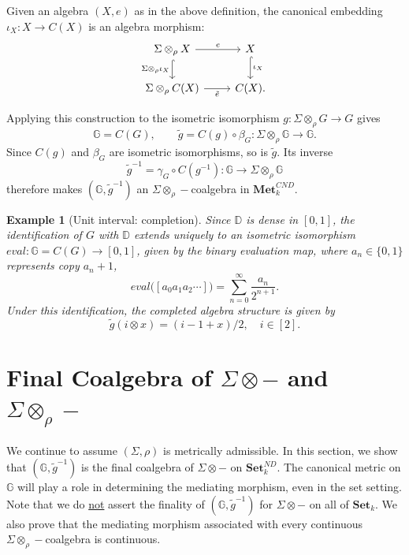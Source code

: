 \documentclass{sn-jnl}%
\theoremstyle{thmstyleone}%
\theoremstyle{thmstyletwo}%
\newtheorem{example}{Example}%
\theoremstyle{thmstylethree}%
\newcommand{\set}{\mathbf{Set}_{k}}
\newcommand{\setnd}{\mathbf{Set}_{k}^{ND}}
\newcommand{\mcnd}{\mathbf{Met}_{k}^{CND}}
\newcommand{\M}{\Sigma}
\newcommand{\F}{\M\otimes}
\newcommand{\Fw}{\M\otimes_{\w}}
\newcommand{\G}{\mathbb{G}}
\newcommand{\g}{\tilde{g}^{-1}}
\newcommand{\w}{\rho}
\begin{document}
Given an algebra $(X,e)$ as in the above definition, the canonical embedding $\iota_X: X \to C(X)$ is an algebra morphism:
\begin{equation}
\label{Eqn_embedingAlgebraToCompletion}
\begin{tikzcd}
    \Fw X \arrow[r,"e"] \arrow[d,hookrightarrow,"\Fw\iota_X"'] & X \arrow[d,hookrightarrow,"\iota_X"]\\
    \Fw C(X) \arrow[r,"\tilde e"'] & C(X).
\end{tikzcd}
\end{equation}

Applying this construction to the isometric isomorphism $g:\Fw G\to G$ gives
\begin{equation} 
\nonumber
    \G=C(G),\qquad \tilde g=C(g)\circ\beta_G:\Fw\G\longrightarrow\G.
\end{equation}
Since $C(g)$ and $\beta_G$ are isometric isomorphisms, so is $\tilde g$. Its inverse 
\begin{equation} 
\nonumber
    \g=\gamma_G\circ C(g^{-1}):\G\longrightarrow\Fw\G
\end{equation}
therefore makes $(\G,\g)$ an $\Fw-$coalgebra in $\mcnd$. 

\begin{example}[Unit interval: completion]
\label{Ex_IntervalCompletion}
    Since $\mathbb D$ is dense in $[0,1]$, the identification of $G$ with $\mathbb D$ extends uniquely to an isometric isomorphism $ eval:\G=C(G)\to [0,1]$, given by the binary evaluation map, where $a_n\in\{0,1\}$ represents copy $a_n+1$, 
    \begin{equation} 
    \nonumber
         eval\big([a_0a_1a_2\cdots]\big) = \sum_{n=0}^{\infty}\frac{a_n}{2^{n+1}}.
    \end{equation}
    Under this identification, the completed algebra structure is given by 
    \begin{equation} \nonumber
        \tilde g(i\otimes x)=(i-1+x)/2, \quad i\in[2].
    \end{equation}
\end{example}

\section{Final Coalgebra of $\F-$ and $\Fw -$}
\label{Sec:FinalCoalgebra}
We continue to assume $(\Sigma,\w)$ is metrically admissible. In this section, we show that $(\G, \g)$ is the final coalgebra of $\F-$ on $\setnd$. The canonical metric on $\G$ will play a role in determining the mediating morphism, even in the set setting. Note that we do \underline{not} assert the finality of $(\G,\g)$ for $\F-$ on all of $\set$.  We also prove that the mediating morphism associated with every continuous $\Fw-$coalgebra is continuous.  
\end{document}
